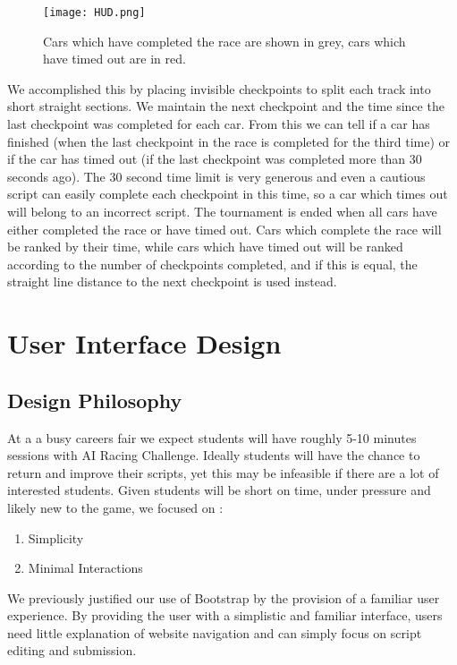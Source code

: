 \begin{figure}[H]
\centering
\texttt{[image: HUD.png]}
\caption{Cars which have completed the race are shown in grey, cars which have timed out are in red.}
\end{figure}

We accomplished this by placing invisible checkpoints to split each track into short straight sections. We maintain the next checkpoint and the time since the last checkpoint was completed for each car. From this we can tell if a car has finished (when the last checkpoint in the race is completed for the third time) or if the car has timed out (if the last checkpoint was completed more than 30 seconds ago). The 30 second time limit is very generous and even a cautious script can easily complete each checkpoint in this time, so a car which times out will belong to an incorrect script. The tournament is ended when all cars have either completed the race or have timed out. Cars which complete the race will be ranked by their time, while cars which have timed out will be ranked according to the number of checkpoints completed, and if this is equal, the straight line distance to the next checkpoint is used instead.

\section{User Interface Design}

\subsection{Design Philosophy}

At a a busy careers fair we expect students will have roughly 5-10 minutes sessions with AI Racing Challenge. Ideally students will have the chance to return and improve their scripts, yet this may be infeasible if there are a lot of interested students. Given students will be short on time, under pressure and likely new to the game, we focused on :
\vspace{-1mm}
\begin{enumerate} \itemsep -2pt 
\item Simplicity
\item Minimal Interactions
\end{enumerate}

We previously justified our use of Bootstrap by the provision of a familiar user experience. By providing the user with a simplistic and familiar interface, users need little explanation of website navigation and can simply focus on script editing and submission. 

